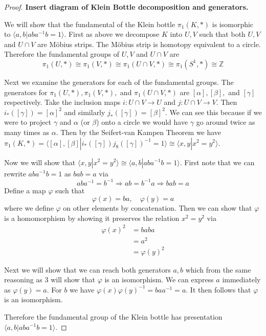 \documentclass[10pt]{article}
\newcommand{\bb}[1]{\mathbb{#1}}
\theoremstyle{plain}
\theoremstyle{remark}
\begin{document}
\begin{proof}
  \textbf{Insert diagram of Klein Bottle decomposition and generators.}

  We will show that the fundamental of the Klein bottle $\pi_1(K,*)$ is
  isomorphic to $\langle a,b|aba^{-1}b=1\rangle$. First as above we decompose
  $K$ into $U,V$ such that both $U,V$ and $U\cap V$ are M\"obius strips.
  The M\"obius strip is homotopy equivalent to a circle. Therefore
  the fundamental groups of $U,V$ and $U\cap V$ are
  \[ \pi_1(U,*)\cong \pi_1(V,*)\cong \pi_1(U\cap V,*)\cong \pi_1(S^1,*)\cong\bb{Z}\]

  Next we examine the generators for each of the fundamental groups. The generators
  for $\pi_1(U,*),\pi_1(V,*),$ and $\pi_1(U\cap V,*)$ are $[\alpha],[\beta],$ and $[\gamma]$ respectively.
  Take the inclusion maps $i:U\cap V\rightarrow U$ and $j:U\cap V \rightarrow V$. Then
  $i_*([\gamma])=[\alpha]^2$ and similarly $j_*([\gamma])=[\beta]^2$. We can see this because if we were
  to project $\gamma$ and $\alpha$ (or $\beta$) onto a circle we would have $\gamma$ go around twice as
  many times as $\alpha$. Then by the Seifert-van Kampen Theorem we have
  $\pi_1(K,*)=\langle [\alpha],[\beta] | i_*([\gamma])j_8([\gamma])^{-1}=1 \rangle\cong \langle x,y| x^2=y^2\rangle$.

  Now we will show that $\langle x,y| x^2=y^2\rangle\cong \langle a,b|aba^{-1}b=1\rangle$. First note that we
  can rewrite $aba^{-1}b=1$ as $bab=a$ via
  \[ aba^{-1}=b^{-1}\Rightarrow ab=b^{-1}a\Rightarrow bab=a \]
  Define a map $\varphi$ such that
  \[ \varphi(x)=ba,\quad \varphi(y)=a\]
  where we define $\varphi$ on other elements by concatenation.
  Then we can show that $\varphi$ is a homomorphism by showing it preserves the relation
  $x^2=y^2$ via
  \begin{align*}
    \varphi(x)^2 &= baba\\
          &= a^2\\
          &= \varphi(y)^2
  \end{align*}

  Next we will show that we can reach both generators $a,b$ which from the same reasoning
  as $3$ will show that $\varphi$ is an isomorphism. We can express $a$ immediately
  as $\varphi(y)=a$. For $b$ we have $\varphi(x)\varphi(y)^{-1}=baa^{-1}=a$. It then follows that $\varphi$
  is an isomorphism.

  Therefore the fundamental group of the Klein bottle has presentation
  $\langle a,b|aba^{-1}b=1\rangle$.
\end{proof}
\end{document}
